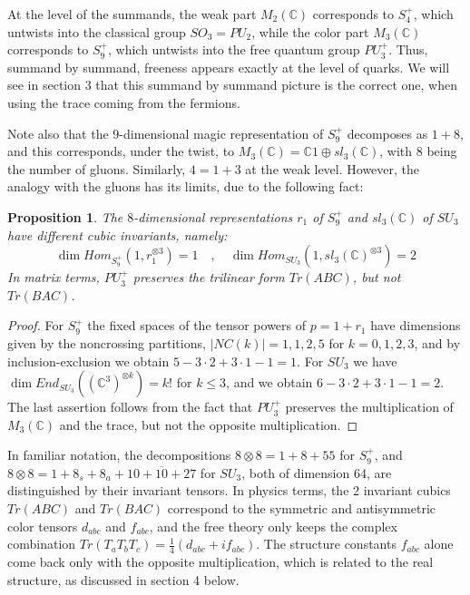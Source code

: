 \documentclass[11pt]{amsart}
\newtheorem{proposition}[theorem]{Proposition}
\theoremstyle{definition}
\begin{document}
At the level of the summands, the weak part $M_2(\mathbb C)$ corresponds to $S_4^+$, which untwists into the classical group $SO_3=PU_2$, while the color part $M_3(\mathbb C)$ corresponds to $S_9^+$, which untwists into the free quantum group $PU_3^+$. Thus, summand by summand, freeness appears exactly at the level of quarks. We will see in section 3 that this summand by summand picture is the correct one, when using the trace coming from the fermions.

Note also that the $9$-dimensional magic representation of $S_9^+$ decomposes as $1+8$, and this corresponds, under the twist, to $M_3(\mathbb C)=\mathbb C1\oplus sl_3(\mathbb C)$, with $8$ being the number of gluons. Similarly, $4=1+3$ at the weak level. However, the analogy with the gluons has its limits, due to the following fact:

\begin{proposition}
The $8$-dimensional representations $r_1$ of $S_9^+$ and $sl_3(\mathbb C)$ of $SU_3$ have different cubic invariants, namely:
$$\dim Hom_{S_9^+}(1,r_1^{\otimes3})=1\quad,\quad\dim Hom_{SU_3}(1,sl_3(\mathbb C)^{\otimes3})=2$$
In matrix terms, $PU_3^+$ preserves the trilinear form $Tr(ABC)$, but not $Tr(BAC)$.
\end{proposition}

\begin{proof}
For $S_9^+$ the fixed spaces of the tensor powers of $p=1+r_1$ have dimensions given by the noncrossing partitions, $|NC(k)|=1,1,2,5$ for $k=0,1,2,3$, and by inclusion-exclusion we obtain $5-3\cdot2+3\cdot1-1=1$. For $SU_3$ we have $\dim End_{SU_3}((\mathbb C^3)^{\otimes k})=k!$ for $k\leq3$, and we obtain $6-3\cdot2+3\cdot1-1=2$. The last assertion follows from the fact that $PU_3^+$ preserves the multiplication of $M_3(\mathbb C)$ and the trace, but not the opposite multiplication.
\end{proof}

In familiar notation, the decompositions $8\otimes8=1+8+55$ for $S_9^+$, and $8\otimes8=1+8_s+8_a+10+\overline{10}+27$ for $SU_3$, both of dimension $64$, are distinguished by their invariant tensors. In physics terms, the 2 invariant cubics $Tr(ABC)$ and $Tr(BAC)$ correspond to the symmetric and antisymmetric color tensors $d_{abc}$ and $f_{abc}$, and the free theory only keeps the complex combination $Tr(T_aT_bT_c)=\frac{1}{4}(d_{abc}+if_{abc})$. The structure constants $f_{abc}$ alone come back only with the opposite multiplication, which is related to the real structure, as discussed in section 4 below.
\end{document}
